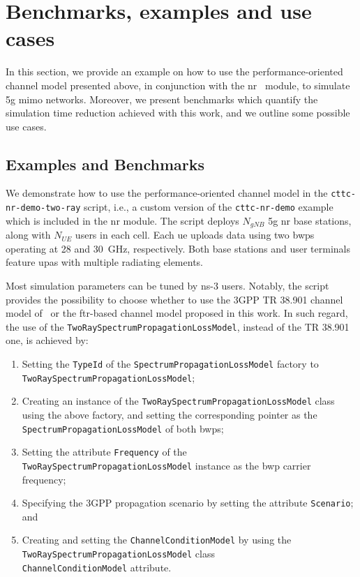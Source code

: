 \section{Benchmarks, examples and use cases}
\label{sec:results-ch-perf}

In this section, we provide an example on how to use the performance-oriented channel model presented above, in conjunction with the \gls{nr}~\cite{patriciello2019e2e} module, to simulate \gls{5g} \gls{mimo} networks. Moreover, we present benchmarks which quantify the simulation time reduction achieved with this work, and we outline some possible use cases.

\subsection{Examples and Benchmarks}

We demonstrate how to use the performance-oriented channel model in the \texttt{cttc-nr-demo-two-ray} script, i.e., a custom version of the \texttt{cttc-nr-demo} example which is included in the \gls{nr} module.
The script deploys $N_{gNB}$ \gls{5g} \gls{nr} base stations, along with $N_{UE}$ users in each cell. Each \gls{ue} uploads data using two \glspl{bwp} operating at 28 and 30~GHz, respectively. Both base stations and user terminals feature \glspl{upa} with multiple radiating elements.


Most simulation parameters can be tuned by ns-3 users. Notably, the script provides the possibility to choose whether to use the 3GPP TR 38.901 channel model of~\cite{tommaso:20} or the \gls{ftr}-based channel model proposed in this work.
In such regard, the use of the \texttt{Two\-Ray\-Spectrum\-Propagation\-Loss\-Model}, instead of the TR 38.901 one, is achieved by:
\begin{enumerate}
\item Setting the \texttt{TypeId} of the \texttt{Spectrum\-Propagation\-Loss\-Model} factory to \texttt{Two\-Ray\-Spectrum\-Propagation\-Loss\-Model}; 
\item Creating an instance of the \texttt{Two\-Ray\-Spectrum\-Propagation\-Loss\-Model} class using the above factory, and setting the corresponding pointer as the \texttt{Spectrum\-Propagation\-Loss\-Model} of both \glspl{bwp}; 
\item  Setting the attribute \texttt{Frequency} of the \texttt{Two\-Ray\-Spectrum\-Propagation\-Loss\-Model} instance as the \gls{bwp} carrier frequency; 
\item  Specifying the 3GPP propagation scenario by setting the attribute \texttt{Scenario}; and 
\item  Creating and setting the \texttt{Channel\-Condition\-Model} by using the \texttt{Two\-Ray\-Spectrum\-Propagation\-Loss\-Model} class \\ \texttt{ChannelConditionModel} attribute. 
\end{enumerate}


